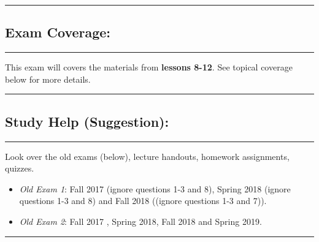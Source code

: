 
{
\noindent
    \rule{\textwidth}{1pt}
    \vspace{1ex}
}
\vspace{-0.35 in}
\subsection*{Exam Coverage:} 
{
\noindent
    \rule{\textwidth}{1pt}
    
}
\noindent This exam will covers the materials from \textbf{lessons 8-12}. See topical coverage below for more details.\\
{
\noindent
    \rule{\textwidth}{1pt}
    \vspace{0ex}
}
  \vspace{-0.25in}
\subsection*{Study Help (Suggestion):} 
{
\noindent
    \rule{\textwidth}{1pt}
    \vspace{1ex}
}
\noindent Look over the old exams (below), lecture handouts, homework assignments, quizzes.
\begin{itemize}[leftmargin=*]
\item \emph{Old Exam 1}: Fall 2017 (ignore questions 1-3 and 8), Spring 2018 (ignore questions 1-3 and 8) and Fall 2018 ((ignore questions 1-3 and 7)).
\item \emph{Old Exam 2}: Fall 2017 , Spring 2018, Fall 2018 and Spring 2019.
\end{itemize}
{
\noindent
    \rule{\textwidth}{1pt}
    \vspace{1ex}
}
  \vspace{-0.25in}
